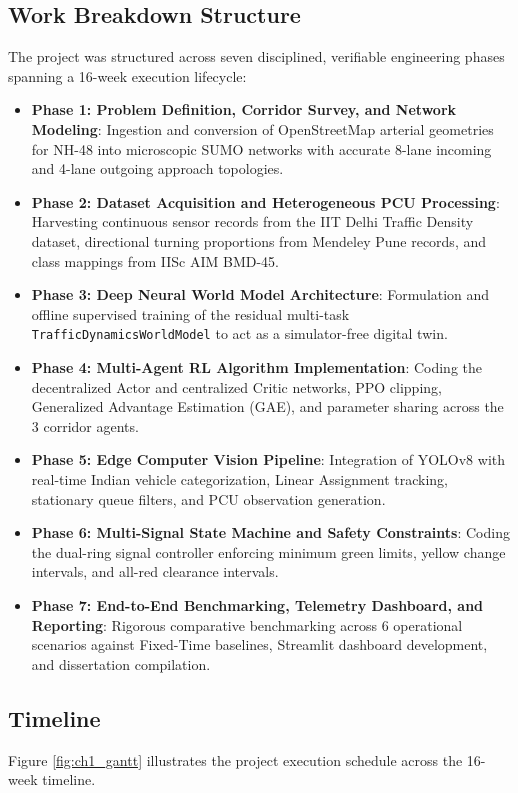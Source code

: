 \documentclass[12pt,a4paper,oneside]{report}
\begin{document}
\subsection{Work Breakdown Structure}
The project was structured across seven disciplined, verifiable engineering phases spanning a 16-week execution lifecycle:
\begin{itemize}
    \item \textbf{Phase 1: Problem Definition, Corridor Survey, and Network Modeling}: Ingestion and conversion of OpenStreetMap arterial geometries for NH-48 into microscopic SUMO networks with accurate 8-lane incoming and 4-lane outgoing approach topologies.
    \item \textbf{Phase 2: Dataset Acquisition and Heterogeneous PCU Processing}: Harvesting continuous sensor records from the IIT Delhi Traffic Density dataset, directional turning proportions from Mendeley Pune records, and class mappings from IISc AIM BMD-45.
    \item \textbf{Phase 3: Deep Neural World Model Architecture}: Formulation and offline supervised training of the residual multi-task \texttt{TrafficDynamicsWorldModel} to act as a simulator-free digital twin.
    \item \textbf{Phase 4: Multi-Agent RL Algorithm Implementation}: Coding the decentralized Actor and centralized Critic networks, PPO clipping, Generalized Advantage Estimation (GAE), and parameter sharing across the 3 corridor agents.
    \item \textbf{Phase 5: Edge Computer Vision Pipeline}: Integration of YOLOv8 with real-time Indian vehicle categorization, Linear Assignment tracking, stationary queue filters, and PCU observation generation.
    \item \textbf{Phase 6: Multi-Signal State Machine and Safety Constraints}: Coding the dual-ring signal controller enforcing minimum green limits, yellow change intervals, and all-red clearance intervals.
    \item \textbf{Phase 7: End-to-End Benchmarking, Telemetry Dashboard, and Reporting}: Rigorous comparative benchmarking across 6 operational scenarios against Fixed-Time baselines, Streamlit dashboard development, and dissertation compilation.
\end{itemize}

\subsection{Timeline}
Figure \ref{fig:ch1_gantt} illustrates the project execution schedule across the 16-week timeline.
\end{document}

